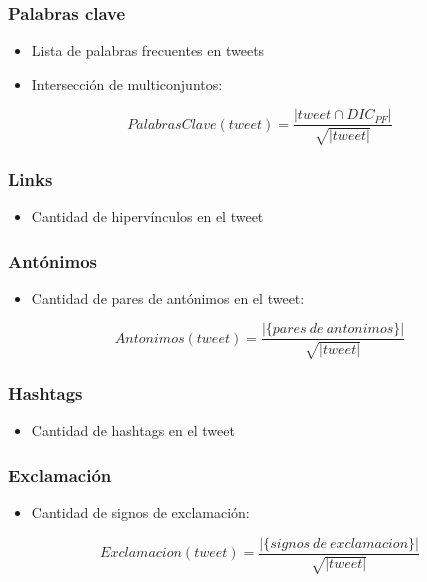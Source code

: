 \begin{frame}
    \frametitle{Palabras clave}

    \begin{itemize}
        \item Lista de palabras frecuentes en tweets
        \item Intersección de multiconjuntos:
    \end{itemize}

    \begin{center}
        \[
            PalabrasClave(tweet) = \frac{|tweet \cap DIC_{PF}|}{\sqrt{|tweet|}}
        \]
    \end{center}
\end{frame}

\begin{frame}
    \frametitle{Links}

    \begin{itemize}
        \item Cantidad de hipervínculos en el tweet
    \end{itemize}
\end{frame}

\begin{frame}
    \frametitle{Antónimos}

    \begin{itemize}
        \item Cantidad de pares de antónimos en el tweet:
    \end{itemize}

    \begin{center}
        \[
            Antonimos(tweet) = \frac{|\{pares\ de\ antonimos\}|}{\sqrt{|tweet|}}
        \]
    \end{center}
\end{frame}

\begin{frame}
    \frametitle{Hashtags}

    \begin{itemize}
        \item Cantidad de hashtags en el tweet
    \end{itemize}
\end{frame}

\begin{frame}
    \frametitle{Exclamación}

    \begin{itemize}
        \item Cantidad de signos de exclamación:
    \end{itemize}

    \begin{center}
        \[
            Exclamacion(tweet) = \frac{|\{signos\ de\ exclamacion\}|}{\sqrt{|tweet|}}
        \]
    \end{center}
\end{frame}


